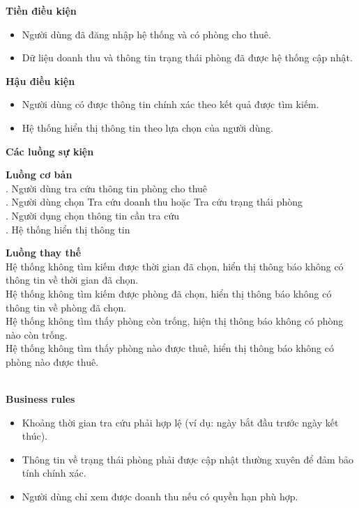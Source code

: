 \textbf{Tiền điều kiện}
\begin{itemize}
    \item Người dùng đã đăng nhập hệ thống và có phòng cho thuê.
    \item Dữ liệu doanh thu và thông tin trạng thái phòng đã được hệ thống cập nhật.
\end{itemize}

\textbf{Hậu điều kiện}
\begin{itemize}
    \item Người dùng có được thông tin chính xác theo kết quả được tìm kiếm.
    \item Hệ thống hiển thị thông tin theo lựa chọn của người dùng.
\end{itemize}

\textbf{Các luồng sự kiện}

\begin{small}
\textbf{Luồng cơ bản}\\
. Người dùng tra cứu thông tin phòng cho thuê\\
. Người dùng chọn Tra cứu doanh thu hoặc Tra cứu trạng thái phòng\\
. Người dụng chọn thông tin cần tra cứu\\
. Hệ thống hiển thị thông tin

\textbf{Luồng thay thế}\\
 Hệ thống không tìm kiếm được thời gian đã chọn, hiển thị thông báo không có thông tin về thời gian đã chọn.\\
 Hệ thống không tìm kiếm được phòng đã chọn, hiển thị thông báo không có thông tin về phòng đã chọn.\\
 Hệ thống không tìm thấy phòng còn trống, hiện thị thông báo không có phòng nào còn trống.\\
 Hệ thống không tìm thấy phòng nào được thuê, hiển thị thông báo không có phòng nào được thuê.\\
\end{small}\\
\textbf{\indent Business rules}
\begin{itemize}
    \item Khoảng thời gian tra cứu phải hợp lệ (ví dụ: ngày bắt đầu trước ngày kết thúc).
    \item Thông tin về trạng thái phòng phải được cập nhật thường xuyên để đảm bảo tính chính xác.
    \item Người dùng chỉ xem được doanh thu nếu có quyền hạn phù hợp.
\end{itemize}

